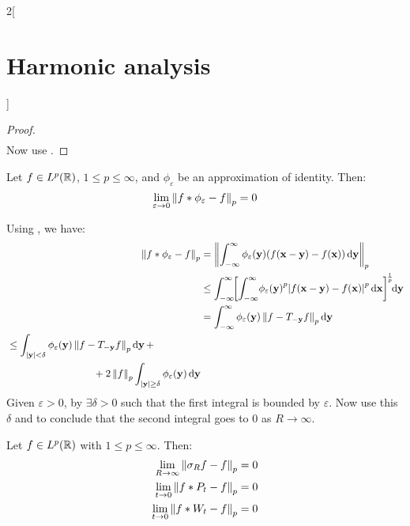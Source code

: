\documentclass[../../../main_math.tex]{subfiles}
\begin{document}
\begin{multicols}{2}[\section{Harmonic analysis}]
\begin{proof}
\begin{align*}
    \end{align*}
    Now use .
  \end{proof}
  \begin{theorem}\label{HA:kernelConvLp}
    Let $f\in L^p(\mathbb{R})$, $1\leq p\leq\infty$, and $\phi_\varepsilon$ be an approximation of identity. Then:
    \begin{equation*}
      \lim_{\varepsilon\to 0}\left\|f*\phi_\varepsilon-f\right\|_p =0 \\
    \end{equation*}
  \end{theorem}
  \begin{sproof}
    Using , we have:
    \begin{align*}
      \norm{f*\phi_\varepsilon-f}_p & =\norm{\int_{-\infty}^{\infty}\phi_\varepsilon(\vf{y})(f(\vf{x}-\vf{y})-f(\vf{x}))\dd{\vf{y}}}_p                                                                                \\
                                    & \leq\int_{-\infty}^{\infty}\!\!{\left[\int_{-\infty}^{\infty}\!{\phi_\varepsilon(\vf{y})}^p\abs{f(\vf{x}-\vf{y})-f(\vf{x})}^p\dd{\vf{x}}\right]}^{\!\frac{1}{p}}\!\!\dd{\vf{y}} \\
                                    & = \int_{-\infty}^{\infty}\phi_\varepsilon(\vf{y})\norm{f-T_{-\vf{y}}f}_p\dd{\vf{y}}                                                                                             \\
      \begin{split}
        & \leq \int_{\abs{\vf{y}}< \delta}\phi_\varepsilon(\vf{y})\norm{f-T_{-\vf{y}}f}_p\dd{\vf{y}}+ \\
        & \hspace{3cm}+2\norm{f}_p\int_{\abs{\vf{y}}\geq\delta}\phi_\varepsilon(\vf{y})\dd{\vf{y}}
      \end{split}
    \end{align*}
    Given $\varepsilon>0$, by  $\exists\delta>0$ such that the first integral is bounded by $\varepsilon$. Now use this $\delta$ and  to conclude that the second integral goes to 0 as $R\to\infty$.
  \end{sproof}
  \begin{corollary}
    Let $f\in L^p(\mathbb{R})$ with $1\leq p\leq\infty$. Then:
    \begin{align*}
      \lim_{R\to\infty}\left\|\sigma_Rf-f\right\|_p & =0 \\
      \lim_{t\to 0}\left\|f*P_t-f\right\|_p         & =0 \\
      \lim_{t\to 0}\left\|f*W_t-f\right\|_p         & =0
    \end{align*}
  \end{corollary}

\end{multicols}
\end{document}
